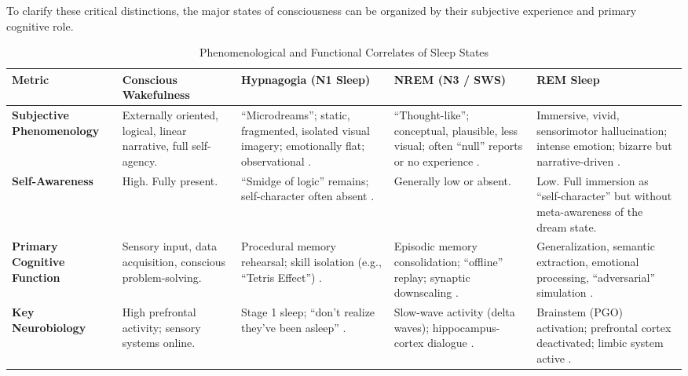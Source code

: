To clarify these critical distinctions, the major states of consciousness can be organized by their subjective experience and primary cognitive role.

\begin{table}[htbp]
\centering
\caption{Phenomenological and Functional Correlates of Sleep States}\label{tab:sleep_states}
\small %
\begin{tabularx}{\textwidth}{l X X X X}
\toprule
\textbf{Metric} & \textbf{Conscious Wakefulness} & \textbf{Hypnagogia (N1 Sleep)} & \textbf{NREM (N3 / SWS)} & \textbf{REM Sleep} \\
\midrule
\textbf{Subjective Phenomenology} & Externally oriented, logical, linear narrative, full self-agency. & ``Microdreams''; static, fragmented, isolated visual imagery; emotionally flat; observational \citep{revonsuo2013important}. & ``Thought-like''; conceptual, plausible, less visual; often ``null'' reports or no experience \citep{revonsuo2013important}. & Immersive, vivid, sensorimotor hallucination; intense emotion; bizarre but narrative-driven \citep{revonsuo2013important}. \\
\addlinespace %
\textbf{Self-Awareness} & High. Fully present. & ``Smidge of logic'' remains; self-character often absent \citep{revonsuo2013important}. & Generally low or absent. & Low. Full immersion as ``self-character'' but without meta-awareness of the dream state. \\
\addlinespace
\textbf{Primary Cognitive Function} & Sensory input, data acquisition, conscious problem-solving. & Procedural memory rehearsal; skill isolation (e.g., ``Tetris Effect'') \citep{stickgold2000tetris}. & Episodic memory consolidation; ``offline'' replay; synaptic downscaling \citep{wilson1994reactivation}. & Generalization, semantic extraction, emotional processing, ``adversarial'' simulation \citep{hoel2021overfitted}. \\
\addlinespace
\textbf{Key Neurobiology} & High prefrontal activity; sensory systems online. & Stage 1 sleep; ``don't realize they've been asleep'' \citep{revonsuo2013important}. & Slow-wave activity (delta waves); hippocampus-cortex dialogue \citep{wilson1994reactivation}. & Brainstem (PGO) activation; prefrontal cortex deactivated; limbic system active \citep{mcnamara2015supernatural, hobson1977activation}. \\
\bottomrule
\end{tabularx}
\end{table}